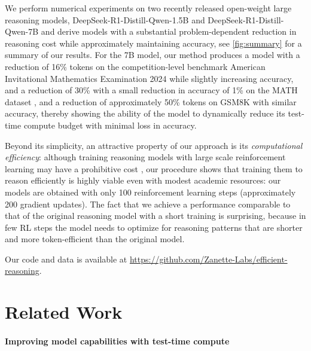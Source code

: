 We perform numerical experiments on two recently released open-weight large reasoning models, DeepSeek-R1-Distill-Qwen-1.5B and DeepSeek-R1-Distill-Qwen-7B \cite{guo2025deepseek}
and derive models with a substantial problem-dependent reduction in reasoning cost while approximately maintaining accuracy, see \cref{fig:summary} for a summary of our results.
For the 7B model, 
our method produces a model with a reduction of 16\% tokens on the competition-level benchmark American Invitational Mathematics Examination 2024 while slightly increasing accuracy, and a reduction of 30\% with a small reduction in accuracy of 1\% on the MATH dataset \cite{hendrycks2021measuring}, and a reduction of approximately 50\% tokens on GSM8K \cite{cobbe2021training} with similar accuracy, thereby showing the ability of the model to dynamically reduce its test-time compute budget with minimal loss in accuracy.



Beyond its simplicity, an attractive property of our approach is its \emph{computational efficiency}:
although training reasoning models
with large scale reinforcement learning 
may have a prohibitive cost \cite{guo2025deepseek},
our procedure shows that training them to reason efficiently is highly viable
even with modest academic resources: 
our models are obtained with only 100 reinforcement learning steps (approximately 200 gradient updates).
The fact that we achieve a performance comparable to that of the original reasoning model with a short training is surprising, because in few RL steps the model needs to  optimize for reasoning patterns that are shorter and more token-efficient than the original model. 

Our code and data is available at \url{https://github.com/Zanette-Labs/efficient-reasoning}.

\section{Related Work}
\label{sec:relatedwork}


\paragraph{Improving model capabilities with test-time compute}

